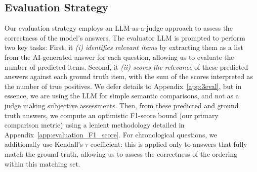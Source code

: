 \documentclass{article}
\begin{document}
\subsection{Evaluation Strategy}
Our evaluation strategy employs an LLM-as-a-judge approach to assess the correctness of the model's answers. The evaluator LLM is prompted to perform two key tasks: First, it \textit{(i) identifies relevant items} by extracting them as a list from the AI-generated answer for each question, allowing us to evaluate the number of predicted items. Second, it \textit{(ii) scores the relevance} of these predicted answers against each ground truth item, with the sum of the scores interpreted as the number of true positives. We defer details to Appendix~\ref{app:3eval}, but in essence, we are using the LLM for simple semantic comparisons, and not as a judge making subjective assessments.
Then, from these predicted and ground truth answers, we compute an optimistic F1-score bound (our primary comparison metric) using a lenient methodology detailed in Appendix~\ref{app:evaluation_F1_score}.
%
For chronological questions, we additionally use Kendall's $\tau$ coefficient: this is applied only to answers that fully match the ground truth, allowing us to assess the correctness of the ordering within this matching set. %
\end{document}
